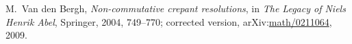 M.~Van den Bergh,
\emph{Non-commutative crepant resolutions},
in \emph{The Legacy of Niels Henrik Abel}, Springer, 2004, 749--770;
corrected version,
arXiv:\href{https://arxiv.org/abs/math/0211064}{math/0211064}, 2009.

